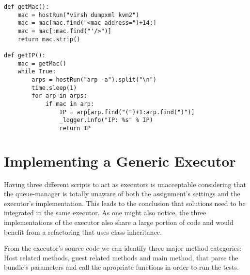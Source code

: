 \lstset{caption=Get the KVM guest's IP, label=lst:kvm-ip}
\begin{lstlisting}
def getMac():
    mac = hostRun("virsh dumpxml kvm2")
    mac = mac[mac.find("<mac address=")+14:]
    mac = mac[:mac.find("'/>")]
    return mac.strip()
    
def getIP():
    mac = getMac()
    while True:
        arps = hostRun("arp -a").split("\n")
        time.sleep(1)
        for arp in arps:
            if mac in arp:
                IP = arp[arp.find("(")+1:arp.find(")")]
                _logger.info("IP: %s" % IP)
                return IP
\end{lstlisting}
       

\section{Implementing a Generic Executor}
\label{sec:vmc-generic}


Having three different scripts to act as executors is unacceptable considering
that the queue-manager is totally unaware of both the assignment's settings
and the executor's implementation. This leads to the conclusion that solutions
need to be integrated in the same executor. As one might also notice, the
three implementations of the executor also share a large portion of code and
would benefit from a refactoring that uses class inheritance.

From the executor's source code we can identify three major method categories:
Host related methods, guest related methods and main method, that parse the
bundle's parameters and call the apropriate functions in order to run the tests.





